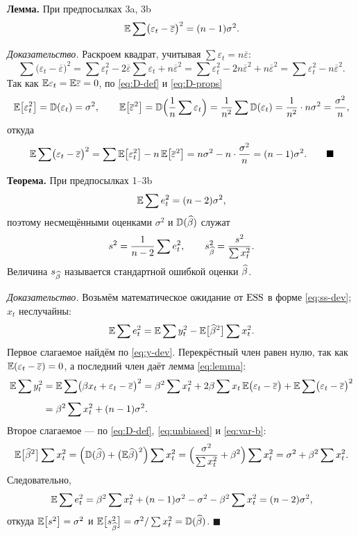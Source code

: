 \textbf{Лемма.} При предпосылках 3a, 3b
\begin{equation}
  \mathbb{E}\sum\bigl(\varepsilon_t - \overline{\varepsilon}\bigr)^2 = (n-1)\sigma^2 .
  \label{eq:lemma}
\end{equation}

\emph{Доказательство.} Раскроем квадрат, учитывая
$\sum\varepsilon_t = n\overline{\varepsilon}$:
\[
  \sum\bigl(\varepsilon_t - \overline{\varepsilon}\bigr)^2
  = \sum\varepsilon_t^2 - 2\overline{\varepsilon}\sum\varepsilon_t + n\overline{\varepsilon}^2
  = \sum\varepsilon_t^2 - 2n\overline{\varepsilon}^2 + n\overline{\varepsilon}^2
  = \sum\varepsilon_t^2 - n\overline{\varepsilon}^2 .
\]
Так как $\mathbb{E}\varepsilon_t = \mathbb{E}\overline{\varepsilon} = 0$, по \eqref{eq:D-def} и
\eqref{eq:D-props}
\[
  \mathbb{E}\bigl[\varepsilon_t^2\bigr] = \mathbb{D}(\varepsilon_t) = \sigma^2,
  \qquad
  \mathbb{E}\bigl[\overline{\varepsilon}^2\bigr]
  = \mathbb{D}\Bigl(\frac{1}{n}\sum\varepsilon_t\Bigr)
  = \frac{1}{n^2}\sum\mathbb{D}(\varepsilon_t)
  = \frac{1}{n^2}\cdot n\sigma^2 = \frac{\sigma^2}{n},
\]
откуда
\[
  \mathbb{E}\sum\bigl(\varepsilon_t - \overline{\varepsilon}\bigr)^2
  = \sum\mathbb{E}\bigl[\varepsilon_t^2\bigr] - n\,\mathbb{E}\bigl[\overline{\varepsilon}^2\bigr]
  = n\sigma^2 - n\cdot\frac{\sigma^2}{n} = (n-1)\sigma^2 .
  \qquad\blacksquare
\]

\textbf{Теорема.} При предпосылках 1--3b
\[
  \mathbb{E}\sum e_t^2 = (n-2)\sigma^2,
\]
поэтому несмещёнными оценками $\sigma^2$ и $\mathbb{D}(\widehat{\beta})$ служат
\begin{equation}
  s^2 = \frac{1}{n-2}\sum e_t^2,
  \qquad
  s_{\widehat{\beta}}^2 = \frac{s^2}{\sum x_t^2}.
  \label{eq:s2}
\end{equation}
Величина $s_{\widehat{\beta}}$ называется стандартной ошибкой оценки $\widehat{\beta}$.

\emph{Доказательство.} Возьмём математическое ожидание от $\mathrm{ESS}$ в форме
\eqref{eq:ss-dev}; $x_t$ неслучайны:
\[
  \mathbb{E}\sum e_t^2 = \mathbb{E}\sum y_t^2 - \mathbb{E}\bigl[\widehat{\beta}^2\bigr]\sum x_t^2 .
\]
Первое слагаемое найдём по \eqref{eq:y-dev}. Перекрёстный член равен нулю, так
как $\mathbb{E}(\varepsilon_t - \overline{\varepsilon}) = 0$, а последний член даёт
лемма \eqref{eq:lemma}:
\[
\begin{aligned}
  \mathbb{E}\sum y_t^2
  &= \mathbb{E}\sum\bigl(\beta x_t + \varepsilon_t - \overline{\varepsilon}\bigr)^2
   = \beta^2\sum x_t^2
     + 2\beta\sum x_t\,\mathbb{E}\bigl(\varepsilon_t - \overline{\varepsilon}\bigr)
     + \mathbb{E}\sum\bigl(\varepsilon_t - \overline{\varepsilon}\bigr)^2 \\[4pt]
  &= \beta^2\sum x_t^2 + (n-1)\sigma^2 .
\end{aligned}
\]
Второе слагаемое — по \eqref{eq:D-def}, \eqref{eq:unbiased} и \eqref{eq:var-b}:
\[
  \mathbb{E}\bigl[\widehat{\beta}^2\bigr]\sum x_t^2
  = \Bigl(\mathbb{D}(\widehat{\beta}) + \bigl(\mathbb{E}\widehat{\beta}\bigr)^2\Bigr)\sum x_t^2
  = \Bigl(\frac{\sigma^2}{\sum x_t^2} + \beta^2\Bigr)\sum x_t^2
  = \sigma^2 + \beta^2\sum x_t^2 .
\]
Следовательно,
\[
  \mathbb{E}\sum e_t^2 = \beta^2\sum x_t^2 + (n-1)\sigma^2 - \sigma^2 - \beta^2\sum x_t^2
  = (n-2)\sigma^2,
\]
откуда $\mathbb{E}\bigl[s^2\bigr] = \sigma^2$ и
$\mathbb{E}\bigl[s_{\widehat{\beta}}^2\bigr] = \sigma^2/\sum x_t^2 = \mathbb{D}(\widehat{\beta})$. $\blacksquare$

